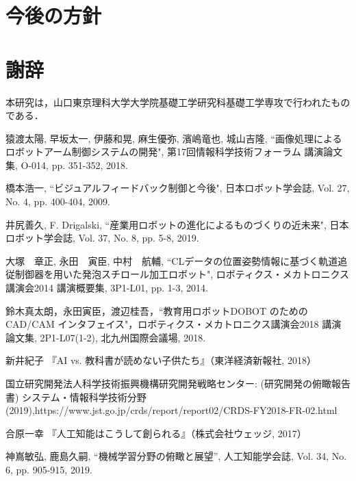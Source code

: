 \documentclass{suribt}
\begin{document}
\chapter{今後の方針}









\backmatter%
\chapter{謝辞}%
本研究は，山口東京理科大学大学院基礎工学研究科基礎工学専攻で行われたものである．
\begin{thebibliography}{}%
猿渡太陽, 早坂太一, 伊藤和晃, 麻生優弥, 濱嶋竜也, 城山吉隆, ``画像処理によるロボットアーム制御システムの開発", 第17回情報科学技術フォーラム 講演論文集, O-014, pp. 351-352, 2018.

橋本浩一, ``ビジュアルフィードバック制御と今後", 日本ロボット学会誌, Vol. 27, No. 4, pp. 400-404, 2009.

井尻善久, F. Drigalski, ``産業用ロボットの進化によるものづくりの近未来", 日本ロボット学会誌, Vol. 37, No. 8, pp. 5-8, 2019.

大塚　章正, 永田　寅臣, 中村　航輔, ``CLデータの位置姿勢情報に基づく軌道追従制御器を用いた発泡スチロール加工ロボット", ロボティクス・メカトロニクス講演会2014 講演概要集, 3P1-L01, pp. 1-3, 2014.

鈴木真太朗，永田寅臣，渡辺桂吾，``教育用ロボットDOBOT のためのCAD/CAM インタフェイス"，ロボティクス・メカトロニクス講演会2018 講演論文集, 2P1-L07(1-2), 北九州国際会議場, 2018.

新井紀子 『AI vs. 教科書が読めない子供たち』（東洋経済新報社, 2018）

国立研究開発法人科学技術振興機構研究開発戦略センター: (研究開発の俯瞰報告書) システム・情報科学技術分野 (2019),https://www.jst.go.jp/crds/report/report02/CRDS-FY2018-FR-02.html

合原一幸 『人工知能はこうして創られる』（株式会社ウェッジ, 2017）

神嶌敏弘, 鹿島久嗣, ``機械学習分野の俯瞰と展望'', 人工知能学会誌, Vol. 34, No. 6, pp. 905-915, 2019.

\end{thebibliography}
\end{document}
